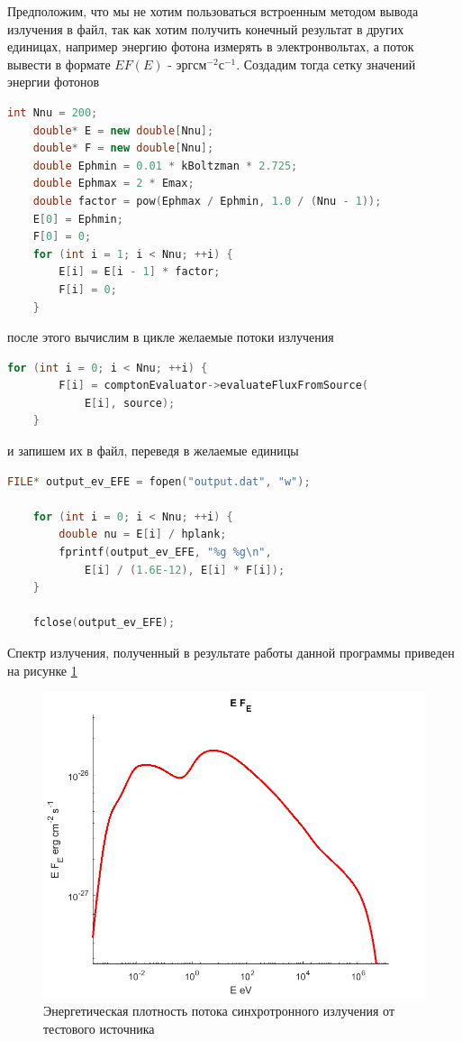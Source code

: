 Предположим, что мы не хотим пользоваться встроенным методом вывода излучения в файл, так как хотим получить конечный результат в других единицах, например энергию фотона измерять в электронвольтах, а поток вывести в формате $E F(E)$ - $\text{эрг}\text{см}^{-2}\text{с}^{-1}$. Создадим тогда сетку значений энергии фотонов
\begin{lstlisting}[language=c++]
	int Nnu = 200;
	double* E = new double[Nnu];
	double* F = new double[Nnu];
	double Ephmin = 0.01 * kBoltzman * 2.725;
	double Ephmax = 2 * Emax;
	double factor = pow(Ephmax / Ephmin, 1.0 / (Nnu - 1));
	E[0] = Ephmin;
	F[0] = 0;
	for (int i = 1; i < Nnu; ++i) {
		E[i] = E[i - 1] * factor;
		F[i] = 0;
	}
\end{lstlisting}
после этого вычислим в цикле желаемые потоки излучения
\begin{lstlisting}[language=c++]
	for (int i = 0; i < Nnu; ++i) {
		F[i] = comptonEvaluator->evaluateFluxFromSource(
		    E[i], source);
	}
\end{lstlisting}
и запишем их в файл, переведя в желаемые единицы
\begin{lstlisting}[language=c++]
	FILE* output_ev_EFE = fopen("output.dat", "w");
	
	for (int i = 0; i < Nnu; ++i) {
		double nu = E[i] / hplank;
		fprintf(output_ev_EFE, "%g %g\n",
		    E[i] / (1.6E-12), E[i] * F[i]);
	}

	fclose(output_ev_EFE);
\end{lstlisting}
Спектр излучения, полученный в результате работы данной программы приведен на рисунке \ref{compton}
\begin{figure}
	\centering
	\includegraphics[width=12.5 cm]{./fig/compton.png} 
	\caption{Энергетическая плотность потока синхротронного излучения от тестового источника}
	\label{compton}
\end{figure}

